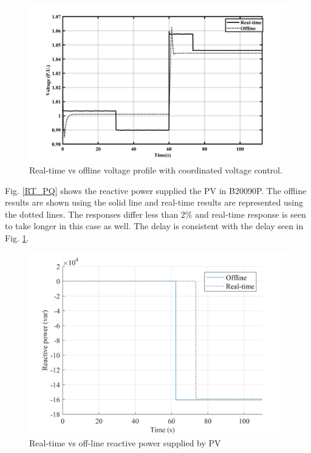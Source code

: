 \begin{figure}[!h]
\centering
\includegraphics[width=\linewidth]{figs/OFF_VS_RT.png}
\caption{Real-time vs offline voltage profile with coordinated voltage control.}
\label{fig:RT_VS_OFF_V}
\end{figure}
Fig. \ref{RT_PQ} shows the reactive power supplied the PV in B20090P. The offline results are shown using the solid line and real-time results are represented using the dotted lines. The responses differ less than 2\% and real-time response is seen to take longer in this case as well. The delay is consistent with the delay seen in Fig. \ref{fig:RT_VS_OFF_V}.

\begin{figure}[!h]
\centering
\includegraphics[width=\linewidth]{figs/PQ_RT.png}
\caption{Real-time vs off-line reactive power supplied by PV}
\label{fig:RT_PQ}
\end{figure}

